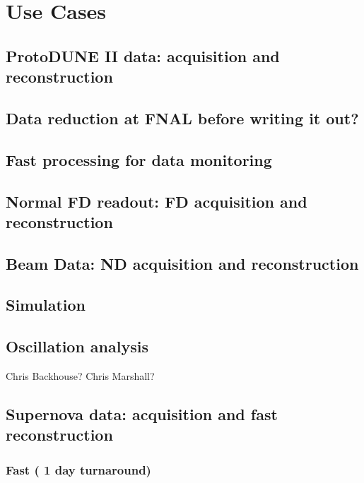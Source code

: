 \chapter{Use Cases}
\label{ch:use}

\section{ProtoDUNE II data: acquisition and reconstruction}

\section{Data reduction at FNAL before writing it out?}

\section{Fast processing for data monitoring} 

\section{Normal FD readout: FD acquisition and reconstruction}
\label{sec:use:fdbeam}  %

\section{Beam Data: ND acquisition and reconstruction}
\label{sec:use:ndbeam}  %

\section{Simulation}   

\section{Oscillation analysis} Chris Backhouse?  Chris Marshall? 
\label{sec:use:osc}

\section{Supernova data: acquisition and fast reconstruction}
\label{sec:use:supernova}  %

\subsection{Fast ( 1 day turnaround)} 


